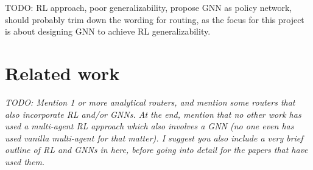 \documentclass[letterpaper]{article}
\begin{document}





TODO: RL approach, poor generalizability, propose GNN as policy network, should probably trim down the wording for routing, as the focus for this project is about designing GNN to achieve RL generalizability.


\section{Related work}


{\it TODO: Mention 1 or more analytical routers, and mention some routers that also incorporate RL and/or GNNs. At the end, mention that no other work has used a multi-agent RL approach which also involves a GNN (no one even has used vanilla multi-agent for that matter). I suggest you also include a very brief outline of RL and GNNs in here, before going into detail for the papers that have used them.}
    
\end{document}

